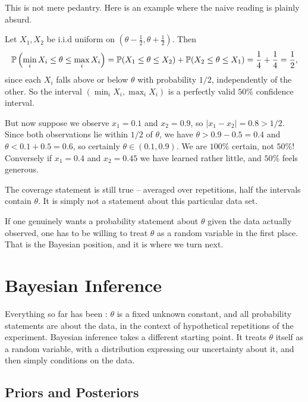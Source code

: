 \documentclass[a4paper]{scrartcl}
\begin{document}
This is not mere pedantry. Here is an example where the naive reading is plainly absurd.

\begin{example}
  Let $X_1, X_2$ be i.i.d uniform on $\left(\theta - \frac{1}{2}, \theta + \frac{1}{2}\right)$. Then
  $$
  \mathbb{P}\left(\min_i X_i \leq \theta \leq \max_i X_i\right) = \mathbb{P}(X_1 \leq \theta \leq X_2) + \mathbb{P}(X_2 \leq \theta \leq X_1) = \frac{1}{4} + \frac{1}{4} = \frac{1}{2},
  $$
  since each $X_i$ falls above or below $\theta$ with probability $1/2$, independently of the other. So the interval $\left(\min_i X_i, \max_i X_i\right)$ is a perfectly valid $50\%$ confidence interval.

  But now suppose we observe $x_1 = 0.1$ and $x_2 = 0.9$, so $|x_1 - x_2| = 0.8 > 1/2$. Since both observations lie within $1/2$ of $\theta$, we have $\theta > 0.9 - 0.5 = 0.4$ and $\theta < 0.1 + 0.5 = 0.6$, so certainly $\theta \in (0.1, 0.9)$. We are $100\%$ certain, not $50\%$! Conversely if $x_1 = 0.4$ and $x_2 = 0.45$ we have learned rather little, and $50\%$ feels generous.

  The coverage statement is still true -- averaged over repetitions, half the intervals contain $\theta$. It is simply not a statement about this particular data set.
\end{example}

If one genuinely wants a probability statement about $\theta$ given the data actually observed, one has to be willing to treat $\theta$ as a random variable in the first place. That is the Bayesian position, and it is where we turn next.


\section{Bayesian Inference}

Everything so far has been : $\theta$ is a fixed unknown constant, and all probability statements are about the data, in the context of hypothetical repetitions of the experiment. Bayesian inference takes a different starting point. It treats $\theta$ itself as a random variable, with a distribution expressing our uncertainty about it, and then simply conditions on the data.

\subsection{Priors and Posteriors}
\end{document}
